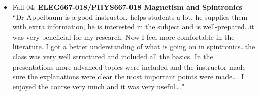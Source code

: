 \documentclass[paper=letter,fontsize=11pt]{scrartcl} %
\newcommand{\CourseEntry}[3]{
		\noindent \item{#1: \textbf{#2} \\ #3}}
\begin{document}
\begin{itemize}
\CourseEntry{Fall 04}{ELEG667-018/PHYS667-018 Magnetism and Spintronics}
{``Dr Appelbaum is a good instructor, helps students a lot, he supplies them with extra information, he is interested in the subject and is well-prepared\ldots it was very beneficial for my research. Now I feel more comfortable in the literature. I got a better understanding of what is going on in spintronics\ldots the class was very well structured and included all the basics. In the presentations more advanced topics were included and the instructor made sure the explanations were clear the most important points were made\ldots. I enjoyed the course very much and it was very useful\ldots."}
\end{itemize}
\end{document}
